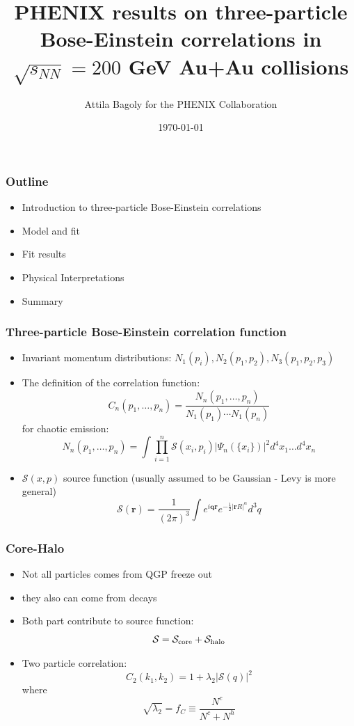 \documentclass{beamer}
\title[HBT]{PHENIX results on three-particle Bose-Einstein correlations
in $\sqrt{s_{NN}}=200$ GeV Au+Au collisions}
\author[Attila Bagoly]{\Large{Attila Bagoly for the PHENIX Collaboration
}\\ \vspace{0.1cm}}
\date[\today]{\today}
\institute[ELTE]{
}
\begin{document}
\begin{frame}
  \titlepage
\end{frame}

\begin{frame}
\frametitle{Outline}
\begin{itemize}
\setlength{\itemsep}{14pt}
\item Introduction to three-particle Bose-Einstein correlations
\item Model and fit
\item Fit results
\item Physical Interpretations
\item Summary
\end{itemize}
\end{frame}

\begin{frame}
\frametitle{Three-particle Bose-Einstein correlation function}
\begin{itemize}
\setlength{\itemsep}{8pt}
\item Invariant momentum distributions: $N_1(p_i), N_2(p_1,p_2),N_3(p_1, p_2, p_3)$
\item The definition of the correlation function:
\begin{equation*}
C_n(p_1,\dots,p_n)=\frac{N_n(p_1,\dots,p_n)}{N_1(p_1)\cdots N_1(p_n)}
\end{equation*}
 for chaotic emission:
\begin{equation*}
N_n(p_1,\dots,p_n)=\int \prod_{i=1}^{n}\mathcal{S}(x_i,p_i)|\Psi_{n}(\{x_i\})|^2 d^4x_1\dots d^4x_n
\end{equation*}
\item $\mathcal{S}(x,p)$ source function (usually assumed to be Gaussian - Levy is more general)
\begin{equation}
\mathcal{S}(\bm{r}) = \frac{1}{(2\pi)^3} \int e^{i\bm{qr}}e^{-\frac{1}{2}|\bm{r}R|^\alpha}d^3q
\end{equation}
\end{itemize}
\end{frame}

\begin{frame}
\frametitle{Core-Halo}
\begin{itemize}
\setlength{\itemsep}{20pt}
\item Not all particles comes from QGP freeze out
\item they also can come from decays
\item Both part contribute to source function:
\begin{equation*}
\mathcal{S}=\mathcal{S}_{\rm core}+\mathcal{S}_{\rm halo}
\end{equation*}

\item Two particle correlation:
\begin{equation*}
C_2(k_1, k_2) =  1+\lambda_2|\mathcal{S}(q)|^2
\end{equation*}
where
\begin{equation*}
\sqrt{\lambda_2} =  f_C \equiv \frac{N^c}{N^c+N^h} 
\end{equation*}
\end{itemize}
\end{frame}
\end{document}
